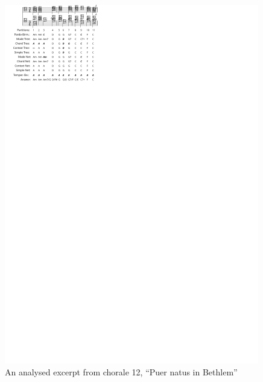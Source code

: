 \documentclass{article}
\begin{document}
\begin{figure}
  \centering
  \includegraphics[scale=4]{coral-012}
  \caption{An analysed excerpt from chorale 12, ``Puer natus in Bethlem''}
  \label{fig:coral-12}
\end{figure}
\end{document}
